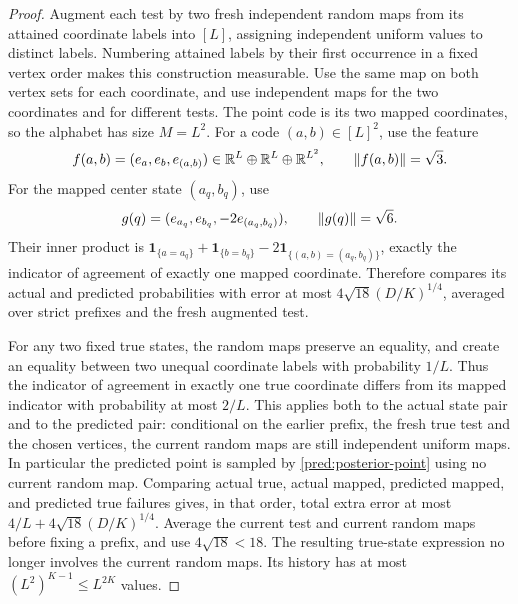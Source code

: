 \begin{proof}
Augment each test by two fresh independent random maps from its attained
coordinate labels into \([L]\), assigning independent uniform values to
distinct labels.  Numbering attained labels by their first occurrence in a
fixed vertex order makes this construction measurable.  Use the same map
on both vertex sets for each coordinate,
and use independent maps for the two coordinates and for different tests.
The point code is its two mapped coordinates, so the alphabet has size
\(M=L^2\).  For a code \((a,b)\in[L]^2\), use the feature
\[
 f(a,b)=(e_a,e_b,e_{(a,b)})\in\mathbb R^L\oplus\mathbb R^L\oplus\mathbb R^{L^2},
 \qquad \lVert f(a,b)\rVert=\sqrt3.
\]
For the mapped center state \((a_q,b_q)\), use
\[
 g(q)=(e_{a_q},e_{b_q},-2e_{(a_q,b_q)}),
 \qquad \lVert g(q)\rVert=\sqrt6.
\]
Their inner product is
\(\mathbf1_{\{a=a_q\}}+\mathbf1_{\{b=b_q\}}
-2\mathbf1_{\{(a,b)=(a_q,b_q)\}}\), exactly the indicator of agreement of exactly one mapped coordinate.  Therefore  compares its actual and
predicted probabilities with error at most
\(4\sqrt{18}(D/K)^{1/4}\), averaged over strict prefixes and the fresh
augmented test.

For any two fixed true states, the random maps preserve an equality, and create
an equality between two unequal coordinate labels with probability \(1/L\).
Thus the indicator of agreement in exactly one true coordinate differs from its mapped indicator with
probability at most \(2/L\).  This applies both to the actual state pair and
to the predicted pair: conditional on the earlier prefix, the fresh true
test and the chosen vertices, the current random maps are still independent
uniform maps.  In particular the predicted point is sampled by
\eqref{pred:posterior-point} using no current random map.  Comparing actual true,
actual mapped, predicted mapped, and predicted true failures gives, in that
order, total extra error at most
\(4/L+4\sqrt{18}(D/K)^{1/4}\).  Average the current test and current random maps
before fixing a prefix, and use \(4\sqrt{18}<18\).  The resulting true-state
expression no longer involves the current random maps.  Its history has at most
\((L^2)^{K-1}\le L^{2K}\) values.
\end{proof}

